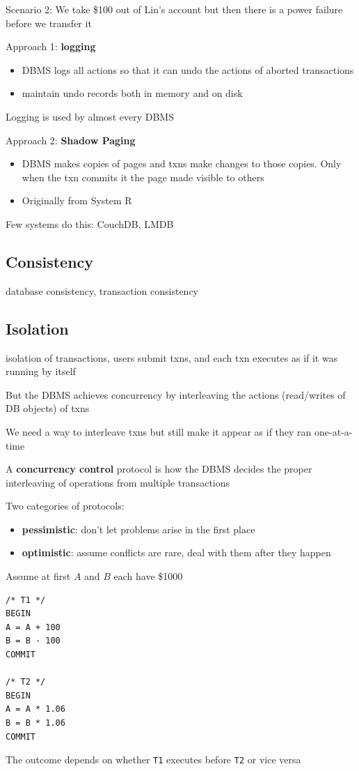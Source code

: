 \documentclass[11pt]{article}
\begin{document}
Scenario 2: We take \$100 out of Lin's account but then there is a power failure before we
transfer it

Approach 1: \textbf{logging}
\begin{itemize}
\item DBMS logs all actions so that it can undo the actions of aborted transactions
\item maintain undo records both in memory and on disk
\end{itemize}

Logging is used by almost every DBMS

Approach 2: \textbf{Shadow Paging}
\begin{itemize}
\item DBMS makes copies of pages and txns make changes to those copies. Only when the txn commits it
the page made visible to others
\item Originally from System R
\end{itemize}

Few systems do this: CouchDB, LMDB
\subsection{Consistency}
\label{sec:org636454c}
database consistency, transaction consistency

\subsection{Isolation}
\label{sec:orgc010eff}
isolation of transactions, users submit txns, and each txn executes as if it was running by
itself

But the DBMS achieves concurrency by interleaving the actions (read/writes of DB objects) of
txns

We need a way to interleave txns but still make it appear as if they ran one-at-a-time

A \textbf{concurrency control} protocol is how the DBMS decides the proper interleaving of operations
from multiple transactions

Two categories of protocols:
\begin{itemize}
\item \textbf{pessimistic}: don't let problems arise in the first place
\item \textbf{optimistic}: assume conflicts are rare, deal with them after they happen
\end{itemize}

Assume at first \(A\) and \(B\) each have \$1000
\begin{verbatim}
/* T1 */
BEGIN
A = A + 100
B = B - 100
COMMIT

/* T2 */
BEGIN
A = A * 1.06
B = B * 1.06
COMMIT
\end{verbatim}
The outcome depends on whether \texttt{T1} executes before \texttt{T2} or vice versa
\end{document}
